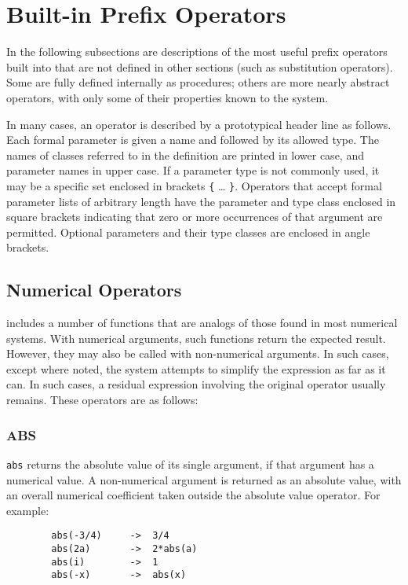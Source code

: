 \chapter{Built-in Prefix Operators}
In the following subsections are descriptions of the most  useful prefix
operators built into {\REDUCE} that are not defined in other sections (such
as substitution operators). Some are fully defined internally as
procedures; others are more nearly abstract operators, with only some of
their properties known to the system.

In many cases, an operator is described by a prototypical header line as
follows. Each formal parameter is given a name and followed by its allowed
type. The names of classes referred to in the definition are printed in
lower case, and parameter names in upper case. If a parameter type is not
commonly used, it may be a specific set enclosed in brackets
\texttt{\{} \ldots{} \texttt{\}}.
Operators that accept formal parameter lists of arbitrary length have the
parameter and type class enclosed in square brackets indicating that zero
or more occurrences of that argument are permitted. Optional parameters
and their type classes are enclosed in angle brackets.

\section{Numerical Operators}
{\REDUCE} includes a number of functions that are analogs of those found
in most numerical systems.  With numerical arguments, such functions
return the expected result.  However, they may also be called with
non-numerical arguments.  In such cases, except where noted, the system
attempts to simplify the expression as far as it can.  In such cases, a
residual expression involving the original operator usually remains.
These operators are as follows:

\subsection{ABS}
\hypertarget{operator:ABS}{}
\texttt{abs} returns the absolute value
of its single argument, if that argument has a numerical value.
A non-numerical argument is returned as an absolute value, with an overall
numerical coefficient taken outside the absolute value operator. For example:
\begin{verbatim}
        abs(-3/4)     ->  3/4
        abs(2a)       ->  2*abs(a)
        abs(i)        ->  1
        abs(-x)       ->  abs(x)
\end{verbatim}

